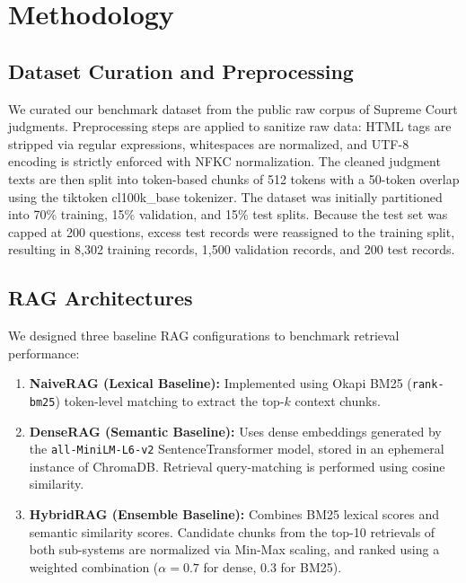 \documentclass[11pt]{article}
\begin{document}
\section{Methodology}

\subsection{Dataset Curation and Preprocessing}

We curated our benchmark dataset from the public raw corpus of Supreme Court judgments. Preprocessing steps are applied to sanitize raw data: HTML tags are stripped via regular expressions, whitespaces are normalized, and UTF-8 encoding is strictly enforced with NFKC normalization. The cleaned judgment texts are then split into token-based chunks of 512 tokens with a 50-token overlap using the tiktoken cl100k\_base tokenizer. The dataset was initially partitioned into 70\% training, 15\% validation, and 15\% test splits. Because the test set was capped at 200 questions, excess test records were reassigned to the training split, resulting in 8,302 training records, 1,500 validation records, and 200 test records.

\subsection{RAG Architectures}

We designed three baseline RAG configurations to benchmark retrieval performance:

\begin{enumerate}

    \item \textbf{NaiveRAG (Lexical Baseline):} Implemented using Okapi BM25 (\texttt{rank-bm25}) token-level matching to extract the top-$k$ context chunks.

    \item \textbf{DenseRAG (Semantic Baseline):} Uses dense embeddings generated by the \texttt{all-MiniLM-L6-v2} SentenceTransformer model, stored in an ephemeral instance of ChromaDB. Retrieval query-matching is performed using cosine similarity.

    \item \textbf{HybridRAG (Ensemble Baseline):} Combines BM25 lexical scores and semantic similarity scores. Candidate chunks from the top-10 retrievals of both sub-systems are normalized via Min-Max scaling, and ranked using a weighted combination ($\alpha=0.7$ for dense, $0.3$ for BM25).

\end{enumerate}
\end{document}
